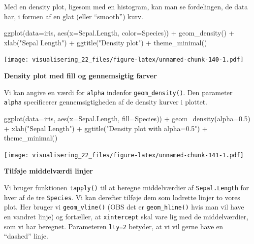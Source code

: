 \documentclass[
]{book}
\newenvironment{Shaded}{\begin{snugshade}}{\end{snugshade}}
\newcommand{\AttributeTok}[1]{\textcolor[rgb]{0.77,0.63,0.00}{#1}}
\newcommand{\FloatTok}[1]{\textcolor[rgb]{0.00,0.00,0.81}{#1}}
\newcommand{\FunctionTok}[1]{\textcolor[rgb]{0.00,0.00,0.00}{#1}}
\newcommand{\NormalTok}[1]{#1}
\newcommand{\SpecialCharTok}[1]{\textcolor[rgb]{0.00,0.00,0.00}{#1}}
\newcommand{\StringTok}[1]{\textcolor[rgb]{0.31,0.60,0.02}{#1}}
\begin{document}
Med en density plot, ligesom med en histogram, kan man se fordelingen, de data har, i formen af en glat (eller ``smooth'') kurv.

\begin{Shaded}
\begin{Highlighting}[]
\FunctionTok{ggplot}\NormalTok{(}\AttributeTok{data=}\NormalTok{iris, }\FunctionTok{aes}\NormalTok{(}\AttributeTok{x=}\NormalTok{Sepal.Length, }\AttributeTok{color=}\NormalTok{Species)) }\SpecialCharTok{+} 
  \FunctionTok{geom\_density}\NormalTok{() }\SpecialCharTok{+} 
  \FunctionTok{xlab}\NormalTok{(}\StringTok{"Sepal Length"}\NormalTok{) }\SpecialCharTok{+} 
  \FunctionTok{ggtitle}\NormalTok{(}\StringTok{"Density plot"}\NormalTok{) }\SpecialCharTok{+}
  \FunctionTok{theme\_minimal}\NormalTok{()}
\end{Highlighting}
\end{Shaded}

\texttt{[image: visualisering\_22\_files/figure-latex/unnamed-chunk-140-1.pdf]}

\textbf{Density plot med fill og gennemsigtig farver}

Vi kan angive en værdi for \texttt{alpha} indenfor \texttt{geom\_density()}. Den parameter \texttt{alpha} specificerer gennemsigtigheden af de density kurver i plottet.

\begin{Shaded}
\begin{Highlighting}[]
\FunctionTok{ggplot}\NormalTok{(}\AttributeTok{data=}\NormalTok{iris, }\FunctionTok{aes}\NormalTok{(}\AttributeTok{x=}\NormalTok{Sepal.Length, }\AttributeTok{fill=}\NormalTok{Species)) }\SpecialCharTok{+} 
  \FunctionTok{geom\_density}\NormalTok{(}\AttributeTok{alpha=}\FloatTok{0.5}\NormalTok{) }\SpecialCharTok{+} 
  \FunctionTok{xlab}\NormalTok{(}\StringTok{"Sepal Length"}\NormalTok{) }\SpecialCharTok{+} 
  \FunctionTok{ggtitle}\NormalTok{(}\StringTok{"Density plot with alpha=0.5"}\NormalTok{) }\SpecialCharTok{+}
  \FunctionTok{theme\_minimal}\NormalTok{()}
\end{Highlighting}
\end{Shaded}

\texttt{[image: visualisering\_22\_files/figure-latex/unnamed-chunk-141-1.pdf]}

\textbf{Tilføje middelværdi linjer}

Vi bruger funktionen \texttt{tapply()} til at beregne middelværdier af \texttt{Sepal.Length} for hver af de tre \texttt{Species}. Vi kan derefter tilføje dem som lodrette linjer to vores plot. Her bruger vi \texttt{geom\_vline()} (OBS det er \texttt{geom\_hline()} hvis man vil have en vandret linje) og fortæller, at \texttt{xintercept} skal vare lig med de middelværdier, som vi har beregnet. Parameteren \texttt{lty=2} betyder, at vi vil gerne have en ``dashed'' linje.
\end{document}
